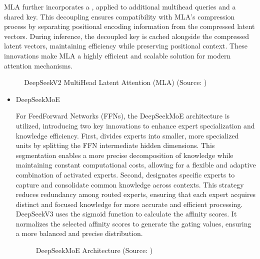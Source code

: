 \documentclass[letterpaper,11pt,english]{sphinxmanual}
\begin{document}
\sphinxAtStartPar
MLA further incorporates a , applied to additional multi\sphinxhyphen{}head queries and a shared key.
This decoupling ensures compatibility with MLA’s compression process
by separating positional encoding information from the compressed
latent vectors. During inference, the decoupled key is cached
alongside the compressed latent vectors, maintaining efficiency while
preserving positional context. These innovations make MLA a highly
efficient and scalable solution for modern attention mechanisms.

\begin{figure}[htbp]
\centering
\capstart

\noindent{}
\caption{DeepSeek\sphinxhyphen{}V2 Multi\sphinxhyphen{}Head Latent Attention (MLA) (Source: )}\label{\detokenize{pretraining:id29}}\end{figure}
\begin{itemize}
\item {} 
\sphinxAtStartPar
DeepSeekMoE

\sphinxAtStartPar
For Feed\sphinxhyphen{}Forward Networks (FFNs), the DeepSeekMoE architecture is
utilized, introducing two key innovations to enhance expert
specialization and knowledge efficiency. First,  divides experts into smaller, more specialized units by
splitting the FFN intermediate hidden dimensions. This segmentation
enables a more precise decomposition of knowledge while maintaining
constant computational costs, allowing for a flexible and adaptive
combination of activated experts. Second, 
designates specific experts to capture and consolidate common
knowledge across contexts. This strategy reduces redundancy among
routed experts, ensuring that each expert acquires distinct and
focused knowledge for more accurate and efficient processing.
DeepSeek\sphinxhyphen{}V3 uses the sigmoid function to calculate the affinity
scores. It normalizes the selected affinity scores to generate the
gating values, ensuring a more balanced and precise distribution.

\begin{figure}[htbp]
\centering
\capstart

\noindent{}
\caption{DeepSeekMoE Architecture (Source: )}\label{\detokenize{pretraining:id30}}\end{figure}

\end{itemize}
\end{document}
